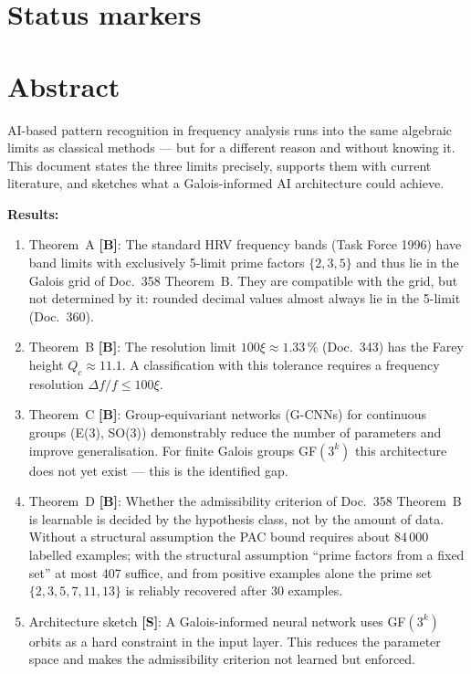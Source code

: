 \providecommand{\BM}{\textbf{[B]}}
\providecommand{\KM}{\textbf{[K]}}
\providecommand{\SM}{\textbf{[S]}}
\providecommand{\XM}{\textbf{[X]}}
\providecommand{\QM}{\textbf{[Q]}}
\providecommand{\EM}{\textbf{[E]}}
\providecommand{\LM}{\textbf{[L]}}

{}

\section*{Status markers}


\section*{Abstract}

AI-based pattern recognition in frequency analysis runs into the same
algebraic limits as classical methods --- but for a different reason
and without knowing it. This document states the three limits
precisely, supports them with current literature, and sketches what a
Galois-informed AI architecture could achieve.

\textbf{Results:}
\begin{enumerate}
\item Theorem~A \BM: The standard HRV frequency bands (Task Force 1996)
  have band limits with exclusively 5-limit prime factors $\{2,3,5\}$ and
  thus lie in the Galois grid of Doc.~358 Theorem~B. They are compatible
  with the grid, but not determined by it: rounded decimal values almost
  always lie in the 5-limit (Doc.~360).
\item Theorem~B \BM: The resolution limit $100\xi\approx1.33\,\%$ (Doc.~343)
  has the Farey height $Q_c\approx11.1$. A classification with this
  tolerance requires a frequency resolution $\Delta f/f\le100\xi$.
\item Theorem~C \BM: Group-equivariant networks (G-CNNs) for continuous
  groups (E(3), SO(3)) demonstrably reduce the number of parameters and
  improve generalisation. For finite Galois groups GF$(3^k)$ this
  architecture does not yet exist --- this is the identified gap.
\item Theorem~D \BM: Whether the admissibility criterion of Doc.~358
  Theorem~B is learnable is decided by the hypothesis class, not by the
  amount of data. Without a structural assumption the PAC bound requires
  about 84\,000 labelled examples; with the structural assumption
  \enquote{prime factors from a fixed set} at most 407 suffice, and from
  positive examples alone the prime set $\{2,3,5,7,11,13\}$ is reliably
  recovered after 30 examples.
\item Architecture sketch \SM: A Galois-informed neural network
  uses GF$(3^k)$ orbits as a hard constraint in the input layer.
  This reduces the parameter space and makes the admissibility criterion
  not learned but enforced.
\end{enumerate}

